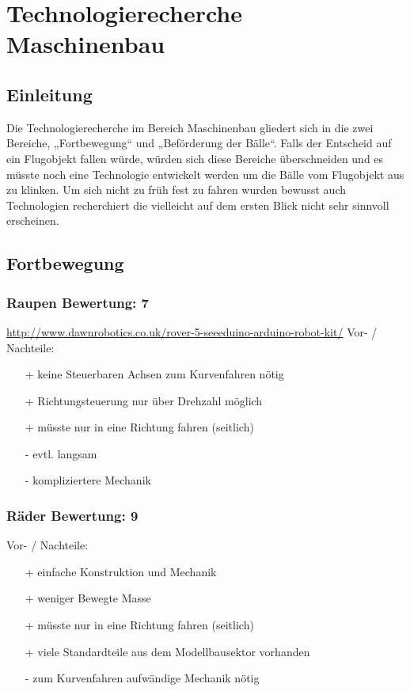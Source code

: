 \section{Technologierecherche Maschinenbau}

\subsection{Einleitung}
Die Technologierecherche im Bereich Maschinenbau gliedert sich in die zwei 
Bereiche, „Fortbewegung“ und  „Beförderung der Bälle“. Falls der Entscheid auf ein Flugobjekt fallen würde, würden sich diese Bereiche überschneiden und es müsste noch eine Technologie entwickelt werden um die Bälle vom Flugobjekt aus zu klinken. Um sich nicht zu früh fest zu fahren wurden bewusst auch Technologien recherchiert die vielleicht auf dem ersten Blick nicht sehr sinnvoll erscheinen.

\subsection{Fortbewegung}

\subsubsection{Raupen \hfill Bewertung: 7}
\url{http://www.dawnrobotics.co.uk/rover-5-seeeduino-arduino-robot-kit/}
Vor- / Nachteile:
\begin{itemize}
    \item[+] keine Steuerbaren Achsen zum Kurvenfahren nötig 
    \item[+] Richtungsteuerung nur über Drehzahl möglich
    \item[+] müsste nur in eine Richtung fahren (seitlich)
    \item[-] evtl. langsam
    \item[-] kompliziertere Mechanik
\end{itemize}

\subsubsection{Räder \hfill Bewertung: 9}
Vor- / Nachteile:
\begin{itemize}
    \item[+] einfache Konstruktion und Mechanik
    \item[+] weniger Bewegte Masse
    \item[+] müsste nur in eine Richtung fahren (seitlich)
    \item[+] viele Standardteile aus dem Modellbausektor vorhanden
    \item[-] zum Kurvenfahren aufwändige Mechanik nötig
\end{itemize}

